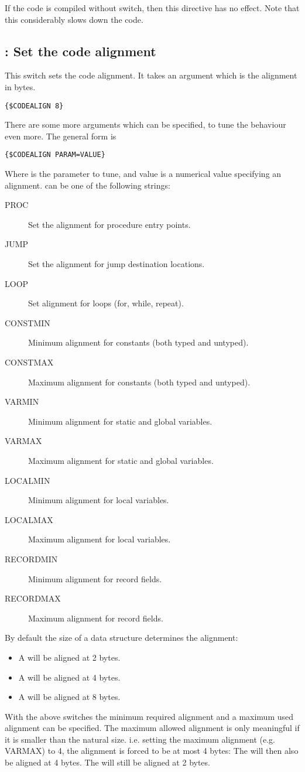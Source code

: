 If the code is compiled without  switch, then this directive has no
effect. Note that this considerably slows down the code.

\subsection{ : Set the code alignment}
This switch sets the code alignment. It takes an argument which is the alignment in bytes.
\begin{verbatim}
{$CODEALIGN 8}
\end{verbatim}
There are some more arguments which can be specified, to tune the behaviour
even more. The general form is
\begin{verbatim}
{$CODEALIGN PARAM=VALUE}
\end{verbatim}
Where  is the parameter to tune, and  value is a
numerical value specifying an alignment.  can be one of the
following strings:
\begin{description}
\item[PROC] Set the alignment for procedure entry points.
\item[JUMP] Set the alignment for jump destination locations.
\item[LOOP] Set alignment for loops (for, while, repeat).
\item[CONSTMIN] Minimum alignment for constants (both typed and untyped).
\item[CONSTMAX] Maximum alignment for constants (both typed and untyped).
\item[VARMIN] Minimum alignment for static and global variables.
\item[VARMAX] Maximum alignment for static and global variables.
\item[LOCALMIN] Minimum alignment for local variables.
\item[LOCALMAX] Maximum alignment for local variables.
\item[RECORDMIN] Minimum alignment for record fields.
\item[RECORDMAX] Maximum alignment for record fields.
\end{description}
By default the size of a data structure determines the alignment:
\begin{itemize}
\item A  will be aligned at 2 bytes.
\item A  will be aligned at 4 bytes.
\item A  will be aligned at 8 bytes. 
\end{itemize}
With the above switches the minimum required alignment and a maximum 
used alignment can be specified. The maximum allowed alignment is only
meaningful if it is smaller than the natural size. i.e. setting the 
maximum alignment (e.g. VARMAX) to 4, the alignment is forced to
be at most 4 bytes: The  will then also be aligned at 
4 bytes. The  will still be aligned at 2 bytes.

